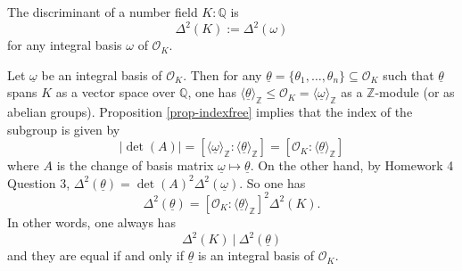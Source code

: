 \begin{definition} 
The discriminant of a number field $K:\mathbb{Q}$ is 
$$\Delta^2(K) := \Delta^2(\omega)$$ for any integral basis $\omega$ of $\mathcal{O}_K$.
\end{definition}



\begin{remark} \label{rmk-intbasis}
    Let $\underline{\omega}$ be an integral basis of $\mathcal{O}_K$. Then for any $\underline{\theta} = \{\theta_1, \dots,\theta_n\} \subseteq \mathcal{O}_K$ such that $\underline{\theta}$ spans $K$ as a vector space over $\mathbb{Q}$, one has $\langle \underline{\theta} \rangle_{\mathbb{Z}} \leq \mathcal{O}_K = \langle \underline{\omega} \rangle_{\mathbb{Z}}$ as a $\mathbb{Z}$-module (or as abelian groups). Proposition \ref{prop-indexfree} implies that the index of the subgroup is given by
    $$|\det(A)| = [\langle \underline{\omega} \rangle_{\mathbb{Z}}: \langle \underline{\theta} \rangle_{\mathbb{Z}}] = [\mathcal{O}_K: \langle \underline{\theta} \rangle_{\mathbb{Z}}]$$
    where $A$ is the change of basis matrix $\underline{\omega} \mapsto \underline{\theta}$. On the other hand, by Homework 4 Question 3, 
    $\Delta^2(\underline{\theta}) = \det(A)^2 \Delta^2(\underline{\omega})$. So one has
    $$\Delta^2(\underline{\theta}) = [\mathcal{O}_K: \langle \underline{\theta} \rangle_{\mathbb{Z}}]^2 \Delta^2(K).$$
    In other words, one always has
    $$\Delta^2(K)\ |\ \Delta^2(\underline{\theta})$$
    and they are equal if and only if $\underline{\theta}$ is an integral basis of $\mathcal{O}_K$.
    \end{remark}

